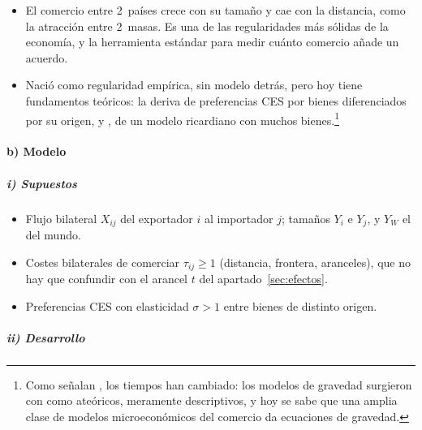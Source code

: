 \documentclass[11pt]{article}
\begin{document}
\begin{itemize}
\item El comercio entre 2~países crece con su tamaño y cae con la distancia, como la atracción entre 2~masas\nocite{Tinbergen1962Shaping}. Es una de las regularidades más sólidas de la economía, y la herramienta estándar para medir cuánto comercio añade un acuerdo.
\item Nació como regularidad empírica, sin modelo detrás, pero hoy tiene fundamentos teóricos: \textcite{Anderson1979} la deriva de preferencias CES por bienes diferenciados por su origen, y \textcite{EatonKortum2002Technology}, de un modelo ricardiano con muchos bienes.\footnote{Como señalan \textcite{CostinotRodriguezClare2014Trade}, los tiempos han cambiado: los modelos de gravedad surgieron con \textcite{Tinbergen1962Shaping} como ateóricos, meramente descriptivos, y hoy se sabe que una amplia clase de modelos microeconómicos del comercio da ecuaciones de gravedad.}
\end{itemize}

\paragraph{b) Modelo}

\subparagraph{i) Supuestos}

\begin{itemize}
\item Flujo bilateral $X_{ij}$ del exportador $i$ al importador $j$; tamaños $Y_i$ e $Y_j$, y $Y_W$ el del mundo.
\item Costes bilaterales de comerciar $\tau_{ij}\geq 1$ (distancia, frontera, aranceles), que no hay que confundir con el arancel $t$ del apartado~\ref{sec:efectos}.
\item Preferencias CES con elasticidad $\sigma>1$ entre bienes de distinto origen\nocite{Anderson1979}.
\end{itemize}

\subparagraph{ii) Desarrollo}
\end{document}
